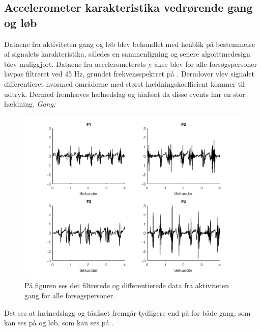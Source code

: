 \subsection{Accelerometer karakteristika vedrørende gang og løb}
Dataene fra aktiviteten gang og løb blev behandlet med henblik på bestemmelse af signalets karakteristika, således en sammenligning og senere algoritmedesign blev muliggjort. Dataene fra accelerometerets y-akse blev for alle forsøgspersoner lavpas filtreret ved 45 Hz, grundet frekvensspektret på . Derudover vlev signalet differentieret hvormed områderne med størst hældningskoefficient kommer til udtryk. Dermed fremhæves hælnedslag og tåafsæt da disse events har en stor hældning.
\newpage
\textit{Gang:}
\begin{figure}[H]
	\centering
	\includegraphics[scale=0.6]{figures/qBilag/gang_diff}
	\caption{På figuren ses det filtrerede og differentierede data fra aktiviteten gang for alle forsøgspersoner.}
	\label{fig:Ap_gangdiff}
\end{figure}

Det ses at hælnedslagg og tåafsæt fremgår tydligere end på  for både gang, som kan ses på  og løb, som kan ses på .

